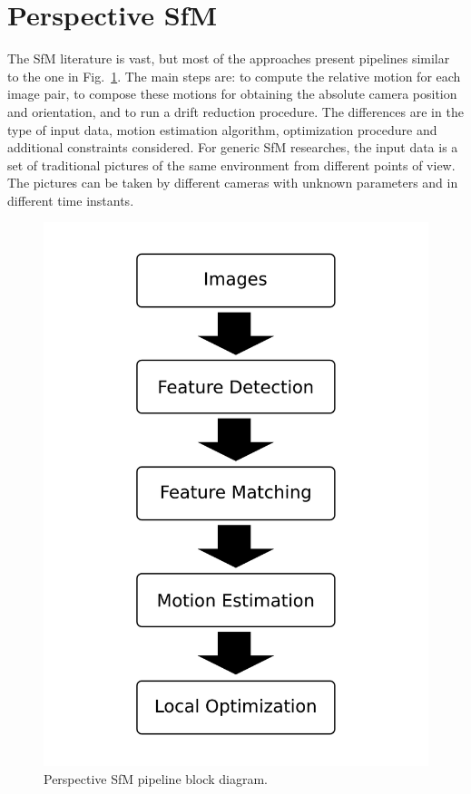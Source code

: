 \section{Perspective SfM}
The SfM literature is vast, but most of the approaches present pipelines similar to the one in 
Fig.~\ref{fig:block_diagram}.
The main steps are: to compute the relative motion for each image pair, 
to compose these motions for obtaining the absolute camera position and 
orientation, and to run a drift reduction procedure.
%
The differences are in the type of input data, motion estimation algorithm,
optimization procedure and additional constraints considered.
For generic SfM researches, the input data is a set of traditional pictures of 
the same environment from different points of view. The pictures can be taken by 
different cameras with unknown parameters and in different time instants.
%
\begin{figure}
	\centering
	\includegraphics[width=\linewidth]{img/block_diagram.pdf}
	\caption{Perspective SfM pipeline block diagram.}
	\label{fig:block_diagram}
\end{figure}

